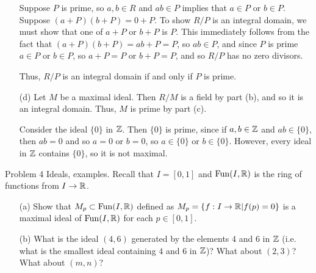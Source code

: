 \documentclass{hmwk}
\begin{document}
\begin{solution}
\begin{itemize}
    Suppose $P$ is prime, so $a, b \in R$ and $ab \in P$ implies that $a \in P$ or $b \in P$. Suppose $(a + P)(b + P) = 0 + P$. To show $R/P$ is an integral domain, we must show that one of $a + P$ or $b + P$ is $P$. This immediately follows from the fact that $(a + P)(b + P) = ab + P = P$, so $ab \in P$, and since $P$ is prime $a \in P$ or $b \in P$, so $a + P = P$ or $b + P = P$, and so $R/P$ has no zero divisors. 
    
    Thus, $R/P$ is an integral domain if and only if $P$ is prime. 

    \item[(d)] Let $M$ be a maximal ideal. Then $R/M$ is a field by part (b), and so it is an integral domain. Thus, $M$ is prime by part (c). 

    Consider the ideal $\{0\}$ in $\mathbb{Z}$. Then $\{0\}$ is prime, since if $a, b \in \mathbb{Z}$ and $ab \in \{0\}$, then $ab = 0$ and so $a = 0$ or $b = 0$, so $a \in \{0\}$ or $b \in \{0\}$. However, every ideal in $\mathbb{Z}$ contains $\{0\}$, so it is not maximal. 
\end{itemize}
\end{solution}

\begin{problem}{Problem 4}
Ideals, examples. Recall that $I = [0,1]$ and $\mathrm{Fun}(I,\mathbb{R})$ is the ring of functions from $I \to \mathbb{R}$.
\begin{itemize}
    \item[(a)] Show that $M_p \subset \mathrm{Fun}(I,\mathbb{R})$ defined as $M_p = \{ f : I \to \mathbb{R} | f(p) = 0\}$ is a maximal ideal of $\mathrm{Fun}(I,\mathbb{R})$ for each $p \in [0,1]$.
    \item[(b)] What is the ideal $(4, 6)$ generated by the elements $4$ and $6$ in $\mathbb{Z}$ (i.e. what is the smallest ideal containing $4$ and $6$ in $\mathbb{Z}$)?  What about $(2,3)$?  What about $(m,n)$? 
\end{itemize}
\end{problem}
\end{document}
